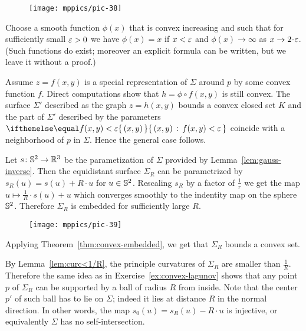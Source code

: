 \begin{wrapfigure}{o}{30 mm}
\vskip-0mm
\centering
\texttt{[image: mppics/pic-38]}
\vskip-0mm
\end{wrapfigure}

Choose a smooth function $\phi(x)$ that is convex increasing and such that for sufficiently small $\varepsilon>0$ we have $\phi(x)=x$ if $x<\varepsilon$ and $\phi(x)\to\infty$ as $x\to 2\cdot\eps$.
(Such functions do exist; moreover an explicit formula can be written, but we leave it without a proof.)

Assume $z=f(x,y)$ is a special representation of $\Sigma$ around $p$ by some convex function $f$.
Direct computations show that $h=\phi\circ f(x,y)$ is still convex.
The surface $\Sigma'$ described as the graph $z=h(x,y)$ bounds a convex closed set $K$ and the part of $\Sigma'$ described by 
the parameters $\set{(x,y)}{f(x,y)<\eps}$ coincide with a neighborhood of $p$ in $\Sigma$.
Hence the general case follows.\qeds

Let $s\:\SS^2\z\to\RR^3$ be the parametization of $\Sigma$ provided by Lemma~\ref{lem:gauss-inverse}.
Then the equidistant surface $\Sigma_R$ can be parametrized by $s_R(u)= s(u)+R\cdot u$ for $u\in\mathbb{S}^2$.
Rescaling $s_R$ by a  factor of $\tfrac1r$ we get the map $u\mapsto \tfrac1R\cdot s(u)+u$ which converges smoothly to the indentity map on the sphere $\mathbb{S}^2$.
Therefore $\Sigma_R$ is embedded for sufficiently large $R$.

\begin{wrapfigure}{o}{47 mm}
\vskip-0mm
\centering
\texttt{[image: mppics/pic-39]}
\vskip-0mm
\end{wrapfigure}

Applying Theorem~\ref{thm:convex-embedded}, we get that $\Sigma_R$ bounds a convex set.

By Lemma~\ref{lem:curc<1/R}, the principle curvatures of $\Sigma_R$ are smaller than $\tfrac1R$.
Therefore the same idea as in Exercise~\ref{ex:convex-lagunov} shows that any point $p$ of $\Sigma_R$ can be supported by a ball of radius $R$ from inside.
Note that the center $p'$ of such ball has to lie on $\Sigma$;
indeed it lies at distance $R$ in the normal direction.
In other words, the map $s_0(u)=s_R(u)-R\cdot u$ is injective, or equivalently $\Sigma$  has no self-intersection.
\qeds

